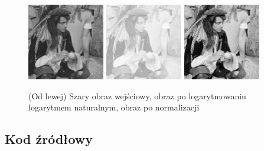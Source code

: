\documentclass[final,a4paper,openany,12pt]{mwbk}
\begin{document}
\begin{figure}[H]
	\begin{center}
		\includegraphics[width=0.3\textwidth]{2/2Gray_Log_Original}
		\includegraphics[width=0.3\textwidth]{2/2Gray_Log_Result}
		\includegraphics[width=0.3\textwidth]{2/2Gray_Log_Result_Norm}
	\end{center}
	\caption{(Od lewej) Szary obraz wejściowy, obraz po logarytmowaniu logarytmem naturalnym, obraz po normalizacji }
\end{figure}

\subsection*{Kod źródłowy}
\end{document}
